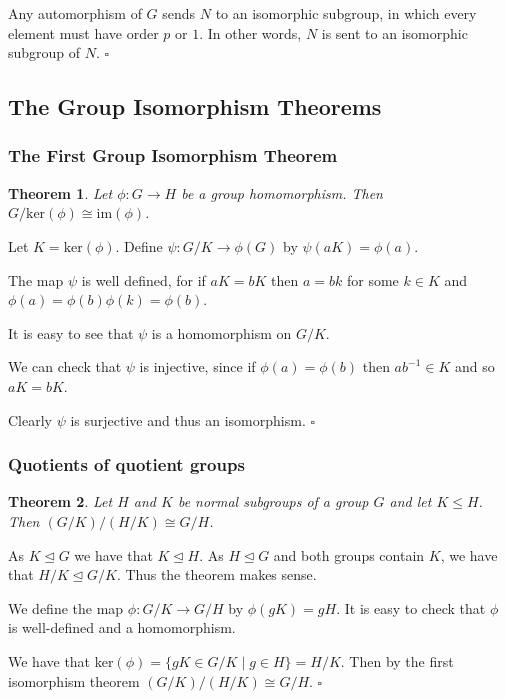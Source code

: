 \documentclass[10pt]{article}
\newtheorem{theorem}{Theorem}[section]
\newenvironment{proof}[1][Proof]{\begin{trivlist}
\item[\hskip \labelsep {\itshape #1}]}{\end{trivlist}}
\begin{document}
\begin{proof}
Any automorphism of $G$ sends $N$ to an isomorphic subgroup, in which every element must have order $p$ or $1$. In other words, $N$ is sent to an isomorphic subgroup of $N$. $\square$
\end{proof}

\subsection{The Group Isomorphism Theorems}

\subsubsection{The First Group Isomorphism Theorem}

\begin{theorem}
Let $\phi : G \to H$ be a group homomorphism. Then $G/\mbox{ker}(\phi) \cong \mbox{im}(\phi)$.
\end{theorem}

\begin{proof}
Let $K = \mbox{ker}(\phi)$. Define $\psi : G/K \to \phi(G)$ by $\psi(aK) = \phi(a)$.

The map $\psi$ is well defined, for if $aK = bK$ then $a = bk$ for some $k \in K$ and $\phi(a) = \phi(b)\phi(k) = \phi(b)$.

It is easy to see that $\psi$ is a homomorphism on $G/K$.

We can check that $\psi$ is injective, since if $\phi(a) = \phi(b)$ then $ab^{-1} \in K$ and so $aK = bK$.

Clearly $\psi$ is surjective and thus an isomorphism. $\square$
\end{proof}

\subsubsection{Quotients of quotient groups}

\begin{theorem}
Let $H$ and $K$ be normal subgroups of a group $G$ and let $K \leq H$. Then $(G/K)/(H/K) \cong G/H$.
\end{theorem}

\begin{proof}
As $K \mathrel{\unlhd} G$ we have that $K \mathrel{\unlhd} H$. As $H \mathrel{\unlhd} G$ and both groups contain $K$, we have that $H/K \mathrel{\unlhd} G/K$. Thus the theorem makes sense.

We define the map $\phi : G/K \to G/H$ by $\phi(gK) = gH$. It is easy to check that $\phi$ is well-defined and a homomorphism.

We have that ker$(\phi) = \{gK \in G/K \;|\; g \in H\} = H/K$. Then by the first isomorphism theorem $(G/K)/(H/K) \cong G/H$. $\square$
\end{proof}
\end{document}
